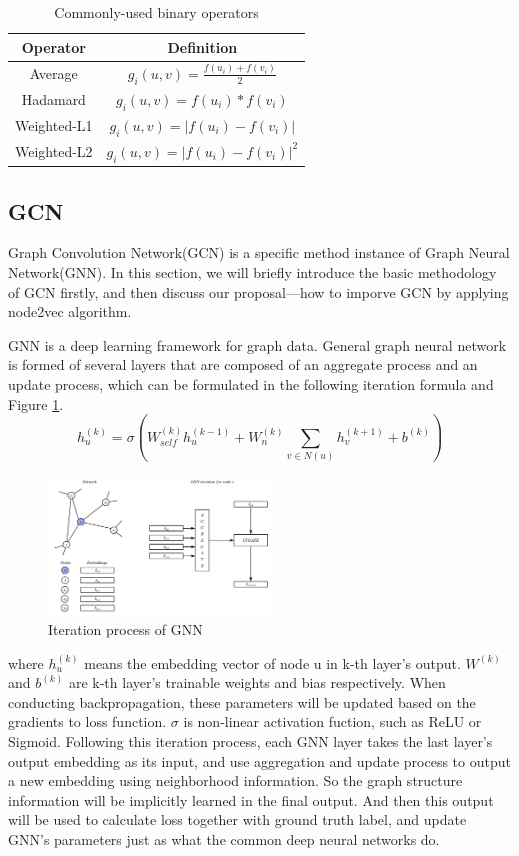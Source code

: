 \documentclass[sigconf]{acmart}
\begin{document}
\begin{table}[!ht]
	\caption{Commonly-used binary operators}
	\label{linkop}
	\centering
	\begin{tabular}{cc}
		\toprule
		\textbf{Operator} &  \textbf{Definition} \\
		\midrule
		Average & $g_i(u,v)=\frac{f(u_i)+f(v_i)}{2}$ \\
		Hadamard & $g_i(u,v)=f(u_i)*f(v_i)$ \\
		Weighted-L1  & $g_i(u,v)=|f(u_i)-f(v_i)|$  \\
		Weighted-L2 & $g_i(u,v)=|f(u_i)-f(v_i)|^2$  \\
		\bottomrule
	\end{tabular}
\end{table}

\subsection{GCN}
Graph Convolution Network(GCN) is a specific method instance of Graph Neural Network(GNN). In this section,  we will briefly introduce the basic methodology of GCN firstly, and then discuss our proposal---how to imporve GCN by applying node2vec algorithm. 

GNN is a deep learning framework for graph data. General graph neural network is formed of several layers that are composed of an aggregate process and an update process, which can be formulated in the following iteration formula and Figure \ref{gnn}.
$$h_u^{(k)}=\sigma(W_{self}^{(k)}h_u^{(k-1)}+W_n^{(k)}\sum_{v\in N(u)}h_v^{(k+1)}+b^{(k)})$$
\begin{figure}[!ht]
	\centering
	\includegraphics[width=6cm]{./figs/gnn.png}
	\caption{Iteration process of GNN}
	\label{gnn}
\end{figure}
where $h_u^{(k)}$ means the embedding vector of node u in k-th layer's output. $W^{(k)}$ and $b^{(k)}$ are k-th layer's trainable weights and bias respectively. When conducting backpropagation, these parameters will be updated based on the gradients to loss function. $\sigma$ is non-linear activation fuction, such as ReLU or Sigmoid. Following this iteration process, each GNN layer takes the last layer’s output embedding as its input, and use aggregation and update process to output a new embedding using neighborhood information. So the graph structure information will be implicitly learned in the final output. And then this output will be used to calculate loss together with ground truth label, and update GNN's parameters just as what the common deep neural networks do.
\end{document}
